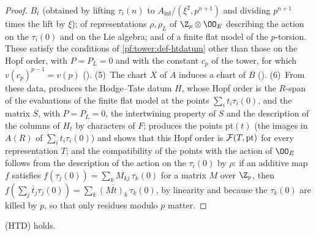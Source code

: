 \begin{proof}
$B_t$ (obtained by lifting $\tau_i(n)$ to $A_{\inf}/(\xi^2,p^{n+1})$ and dividing $p^{n+1}$ times the lift by
$\xi$); of representations $\rho,\rho_L$ of $\Z_p\otimes\OO_E$ describing the action on the $\tau_i(0)$ and on
the Lie algebra; and of a finite flat model of the $p$-torsion. These satisfy the conditions of
\cref{pf:tower:def-htdatum} other than those on the Hopf order, with $P=P_L=0$ and with the constant $c_p$
of the tower, for which $v(c_p)^{p-1}=v(p)$ ().
(5)~The chart $X$ of $A$ induces a chart of $B$ ().
(6)~From these data,  produces the Hodge--Tate datum
$H$, whose Hopf order is the $R$-span of the evaluations of the finite flat model at the points
$\sum_it_i\tau_i(0)$, and the matrix $S$, with $P=P_L=0$, the intertwining property of $S$ and the description of
the columns of $H_t$ by characters of $F$;
 produces the points $\mathrm{pt}(t)$ (the images in
$A(R)$ of $\sum_it_i\tau_i(0)$) and shows that this Hopf order is $\mathcal F(T,\mathrm{pt})$ for every
representation $T$; and the compatibility of the points with the action of $\OO_E$ follows from the
description of the action on the $\tau_i(0)$ by $\rho$: if an additive map $f$ satisfies
$f(\tau_j(0))=\sum_k\overline{M_{kj}}\,\tau_k(0)$ for a matrix $M$ over $\Z_p$, then
$f(\sum_j\bar t_j\tau_j(0))=\sum_k\overline{(Mt)_k}\,\tau_k(0)$, by linearity and because the $\tau_k(0)$ are killed by $p$,
so that only residues modulo $p$ matter.
\end{proof}

\begin{theorem}\label{pf:tower:htd}
\textup{(HTD)} holds.
\end{theorem}

